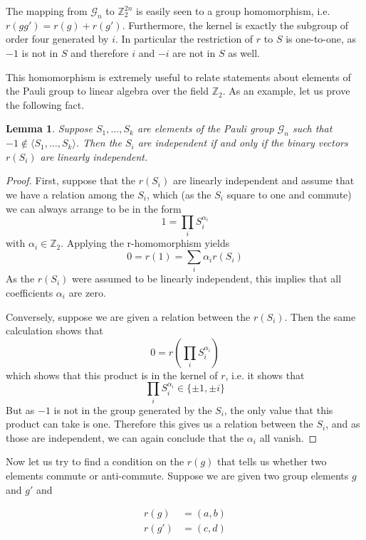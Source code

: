 \documentclass[a4paper, draft]{article}
\theoremstyle{own}
\newtheorem{lem}[thm]{Lemma}
\theoremstyle{remark}
\newcommand{\Z}{\mathbb{Z}}
\begin{document}
The mapping from $\mathcal{G}_n$ to $\Z_2^{2n}$ is easily seen to a group homomorphism, i.e. $r(g g') = r(g) + r(g')$. Furthermore, the kernel is exactly the subgroup of order four generated by $i$. In particular the restriction of $r$ to $S$ is one-to-one, as $-1$ is not in $S$ and therefore $i$ and $-i$ are not in $S$ as well.

This homomorphism is extremely useful to relate statements about elements of the Pauli group to linear algebra over the field $\Z_2$. As an example, let us prove the following fact.

\begin{lem}
Suppose $S_1, \dots, S_k$ are elements of the Pauli group $\mathcal{G}_n$ such that $-1 \notin \langle S_1, \dots, S_k \rangle$. Then the $S_i$ are independent if and only if the binary vectors $r(S_i)$ are linearly independent.
\end{lem}

\begin{proof}
First, suppose that the $r(S_i)$ are linearly independent and assume that we have a relation among the $S_i$, which (as the $S_i$ square to one and commute) we can always arrange to be in the form
$$
1 = \prod_i S_i^{\alpha_i}
$$
with $\alpha_i \in \Z_2$. Applying the r-homomorphism yields
$$
0 = r(1) = \sum_i \alpha_i r(S_i)
$$
As the $r(S_i)$ were assumed to be linearly independent, this implies that all coefficients $\alpha_i$ are zero.

Conversely, suppose we are given a relation between the $r(S_i)$. Then the same calculation shows that
$$
0 = r(\prod_i S_i^{\alpha_i})
$$
which shows that this product is in the kernel of $r$, i.e. it shows that
$$
\prod_i S_i^{\alpha_i} \in \{  \pm 1, \pm i \}
$$
But as $-1$ is not in the group generated by the $S_i$, the only value that this product can take is one. Therefore this gives us a relation between the $S_i$, and as those are independent, we can again conclude that the $\alpha_i$ all vanish.
\end{proof}


Now let us try to find a condition on the $r(g)$ that tells us whether two elements commute or anti-commute. Suppose we are given two group elements $g$ and $g'$ and

\begin{align*}
r(g) &= (a , b) \\
r(g') &= (c, d)
\end{align*}
\end{document}
